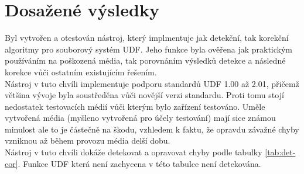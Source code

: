 \section{Dosažené výsledky}
\label{sec:vysledky}
Byl vytvořen a otestován nástroj, který implmentuje jak detekční, tak korekční algoritmy pro souborový systém UDF. Jeho funkce byla ověřena jak praktickým používáním na poškozená média, tak porovnáním výsledků detekce a následné korekce vůči ostatním existujícím řešením.\\
Nástroj v tuto chvíli implementuje podporu standardů UDF 1.00 až 2.01, přičemž většina vývoje byla soustředěna vůči novější verzi standardu. Proti tomu stojí nedostatek testovacích médií vůči kterým bylo zařízení testováno. Uměle vytvořená média (myšleno vytvořená pro účely testování) mají sice známou minulost ale to je částečně na škodu, vzhledem k faktu, že opravdu závažné chyby vzniknou až během provozu média delší dobu.\\
Nástroj v tuto chvíli dokáže detekovat a opravovat chyby podle tabulky \ref{tab:det-cor}. Funkce UDF která není zachycena v této tabulce není detekována.
